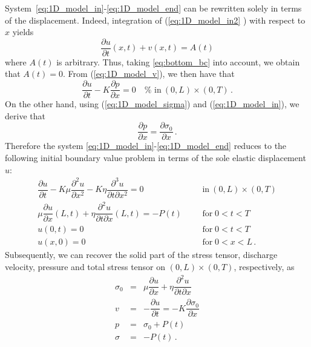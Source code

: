 \documentclass[12pt,a4paper]{amsart}
\theoremstyle{definition}
\begin{document}
System~\eqref{eq:1D_model_in}-\eqref{eq:1D_model_end} can be rewritten solely in
terms of the displacement. Indeed, integration of (\ref{eq:1D_model_in2}%
) with respect to $x$ yields
\begin{equation*}
\dfrac{\partial u}{\partial t}(x,t)+v(x,t)=A(t)
\end{equation*}%
where $A\left( t\right) $ is arbitrary. Thus, taking \eqref{eq:bottom_bc} into
account, we obtain that $A\left( t\right) =0$. From (\ref{eq:1D_model_v}), we then have that%
\begin{equation*}
\dfrac{\partial u}{\partial t}-K\dfrac{\partial p}{\partial x}=0\quad \text{%
in}\ (0,L)\times (0,T)\,.
\end{equation*}%
On the other hand, using (\ref{eq:1D_model_sigma}) and (\ref{eq:1D_model_in}),
we derive that
\begin{equation*}
\dfrac{\partial p}{\partial x}=\dfrac{\partial \sigma _{0}}{\partial x}\,.
\end{equation*}%
Therefore the system \eqref{eq:1D_model_in}-\eqref{eq:1D_model_end} reduces to the following
initial boundary value problem in terms of the sole elastic displacement $u$:
\begin{subequations}
\label{eq:1d_problem_per_u}
\begin{align}
\dfrac{\partial u}{\partial t}-K\mu \dfrac{\partial ^{2}u}{\partial x^{2}}%
-K\eta \dfrac{\partial ^{3}u}{\partial t\partial x^{2}}=0 &  & & %
\mbox{in}\ (0,L)\times (0,T) \label{eq:balance_for_u} \\[3mm]
\mu \dfrac{\partial u}{\partial x}\left( L,t\right) +\eta \dfrac{\partial
^{2}u}{\partial t\partial x}\left( L,t\right) =-P\left( t\right)
& & &
\mbox{for}\;0<t<T \label{eq:bc_x_L} \\
u\left( 0,t\right) =0 & & & \mbox{for}\;0<t<T \label{eq:bc_x_0} \\
u\left( x,0\right) =0 & & & \mbox{for}\;0<x<L \,.\label{eq:ic}
\end{align}%
\end{subequations}
Subsequently, we can recover the solid part of the stress tensor, discharge velocity,
pressure and total stress tensor on $(0,L)\times (0,T)$, respectively, as
\begin{subequations}
\label{eq:1d_problem}
\begin{eqnarray}
\sigma _{0} &=&\mu \dfrac{\partial u}{\partial x}+\eta \dfrac{\partial ^{2}u%
}{\partial t\partial x} \\
v &=&-\dfrac{\partial u}{\partial t}=-K\dfrac{\partial \sigma _{0}}{\partial
x}  \label{v} \\
p &=&\sigma _{0}+P\left( t\right)   \label{p} \\
\sigma  &=&-P\left( t\right) \,. \label{eq:1d_problem_end}
\end{eqnarray}
\end{subequations}
\end{document}
